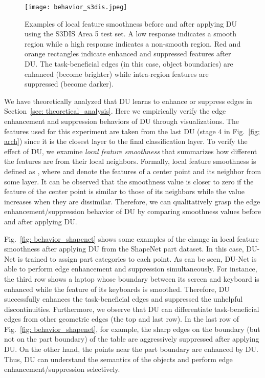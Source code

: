 \documentclass[a4paper,fleqn]{cas-dc}
\begin{document}
\begin{figure*}[t]
    \centering 
        \texttt{[image: behavior\_s3dis.jpeg]}
    \caption{Examples of local feature smoothness before and after applying DU using the S3DIS Area 5 test set. A low response indicates a smooth region while a high response indicates a non-smooth region. Red and orange rectangles indicate enhanced and suppressed features after DU.
    The task-beneficial edges (in this case, object boundaries) are enhanced (become brighter) while intra-region features are suppressed (become darker). 
}
    \label{fig: behavior_s3dis}
\end{figure*}
We have theoretically analyzed that DU learns to enhance or suppress edges in Section~\ref{sec: theoretical_analysis}. Here we empirically verify the edge enhancement and suppression behaviors of DU through visualizations. The features used for this experiment are taken from the last DU (stage 4 in Fig.~\ref{fig: arch}) since it is the closest layer to the final classification layer. To verify the effect of DU, we examine \textit{local feature smoothness} that summarizes how different the features are from their local neighbors. 
Formally, local feature smoothness is defined as
, where  and  denote the features of a center point and its neighbor from some layer. It can be observed that the smoothness value is closer to zero if the feature of the center point is similar to those of its neighbors while the value increases when they are dissimilar. Therefore, we can qualitatively grasp the edge enhancement/suppression behavior of DU by comparing smoothness values before and after applying DU. 


Fig.~\ref{fig: behavior_shapenet} shows some examples of the change in local feature smoothness after applying DU from the ShapeNet part dataset. In this case, DU-Net is trained to assign part categories to each point. 
As can be seen, DU-Net is able to perform edge enhancement and suppression simultaneously. For instance, the third row shows a laptop whose boundary between its screen and keyboard is enhanced while the feature of its keyboards is smoothed. Therefore, DU successfully enhances the task-beneficial edges and suppressed the unhelpful discontinuities. 
Furthermore, we observe that DU can differentiate task-beneficial edges from other geometric edges (the top and last row). In the last row of Fig.~\ref{fig: behavior_shapenet}, for example, the sharp edges on the boundary (but not on the part boundary) of the table are aggressively suppressed after applying DU. On the other hand, the points near the part boundary are enhanced by DU. Thus, DU can understand the semantics of the objects and perform edge enhancement/suppression selectively.
\end{document}

